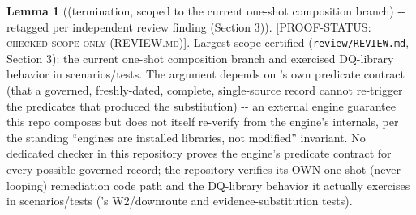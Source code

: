 \documentclass[11pt,a4paper]{article}
\theoremstyle{definition}
\newtheorem{lemma}{Lemma}
\newcommand{\proofstatus}[1]{[\textsc{PROOF-STATUS}: \textsc{#1}]}
\begin{document}
\begin{lemma}[(termination, scoped to the current one-shot composition branch) -{}- retagged per independent review finding (Section 3)]
\proofstatus{checked-scope-only (REVIEW.md)}. Largest scope certified (\texttt{review/REVIEW.md}, Section 3): the current one-shot composition branch and exercised DQ-library behavior in scenarios/tests. The argument depends on 's own predicate contract (that a governed, freshly-dated, complete, single-source record cannot re-trigger the predicates that produced the substitution) -{}- an external engine guarantee this repo composes but does not itself re-verify from the engine's internals, per the standing ``engines are installed libraries, not modified'' invariant. No dedicated checker in this repository proves the engine's predicate contract for every possible governed record; the repository verifies its OWN one-shot (never looping) remediation code path and the DQ-library behavior it actually exercises in scenarios/tests ('s W2/downroute and evidence-substitution tests).
\end{lemma}
\end{document}
